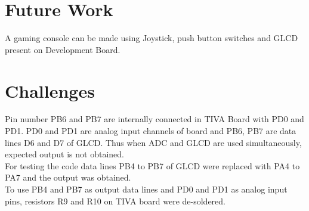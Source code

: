 \documentclass[a4paper,12pt,oneside]{book}
\begin{document}
\section{Future Work}
A gaming console can be made using Joystick, push button switches and GLCD present on Development Board.


\section{Challenges}
Pin number PB6 and PB7 are internally connected in TIVA Board with PD0 and PD1. PD0 and PD1 are analog input channels of board and PB6, PB7 are data lines D6 and D7 of GLCD. Thus when ADC and GLCD are used simultaneously, expected output is not obtained. \\
For testing the code data lines PB4 to PB7 of GLCD were replaced with PA4 to PA7 and the output was obtained.\\
To use PB4 and PB7 as output data lines and PD0 and PD1 as analog input pins, resistors R9 and R10 on TIVA board were de-soldered.

\newpage
\end{document}
